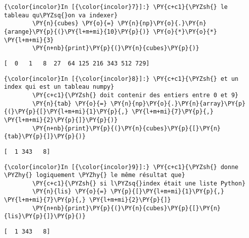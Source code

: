     \begin{Verbatim}[commandchars=\\\{\},frame=single,framerule=0.3mm,rulecolor=\color{cellframecolor}]
{\color{incolor}In [{\color{incolor}7}]:} \PY{c+c1}{\PYZsh{} le tableau qu\PYZsq{}on va indexer}
        \PY{n}{cubes} \PY{o}{=} \PY{n}{np}\PY{o}{.}\PY{n}{arange}\PY{p}{(}\PY{l+m+mi}{10}\PY{p}{)} \PY{o}{*}\PY{o}{*} \PY{l+m+mi}{3}
        \PY{n+nb}{print}\PY{p}{(}\PY{n}{cubes}\PY{p}{)}
\end{Verbatim}


    \begin{Verbatim}[commandchars=\\\{\},frame=single,framerule=0.3mm,rulecolor=\color{cellframecolor}]
[  0   1   8  27  64 125 216 343 512 729]
\end{Verbatim}

    \begin{Verbatim}[commandchars=\\\{\},frame=single,framerule=0.3mm,rulecolor=\color{cellframecolor}]
{\color{incolor}In [{\color{incolor}8}]:} \PY{c+c1}{\PYZsh{} et un index qui est un tableau numpy}
        \PY{c+c1}{\PYZsh{} doit contenir des entiers entre 0 et 9}
        \PY{n}{tab} \PY{o}{=} \PY{n}{np}\PY{o}{.}\PY{n}{array}\PY{p}{(}\PY{p}{[}\PY{l+m+mi}{1}\PY{p}{,} \PY{l+m+mi}{7}\PY{p}{,} \PY{l+m+mi}{2}\PY{p}{]}\PY{p}{)}
        \PY{n+nb}{print}\PY{p}{(}\PY{n}{cubes}\PY{p}{[}\PY{n}{tab}\PY{p}{]}\PY{p}{)}
\end{Verbatim}


    \begin{Verbatim}[commandchars=\\\{\},frame=single,framerule=0.3mm,rulecolor=\color{cellframecolor}]
[  1 343   8]
\end{Verbatim}

    \begin{Verbatim}[commandchars=\\\{\},frame=single,framerule=0.3mm,rulecolor=\color{cellframecolor}]
{\color{incolor}In [{\color{incolor}9}]:} \PY{c+c1}{\PYZsh{} donne \PYZhy{} logiquement \PYZhy{} le même résultat que}
        \PY{c+c1}{\PYZsh{} si l\PYZsq{}index était une liste Python}
        \PY{n}{lis} \PY{o}{=} \PY{p}{[}\PY{l+m+mi}{1}\PY{p}{,} \PY{l+m+mi}{7}\PY{p}{,} \PY{l+m+mi}{2}\PY{p}{]}
        \PY{n+nb}{print}\PY{p}{(}\PY{n}{cubes}\PY{p}{[}\PY{n}{lis}\PY{p}{]}\PY{p}{)}
\end{Verbatim}


    \begin{Verbatim}[commandchars=\\\{\},frame=single,framerule=0.3mm,rulecolor=\color{cellframecolor}]
[  1 343   8]
\end{Verbatim}

